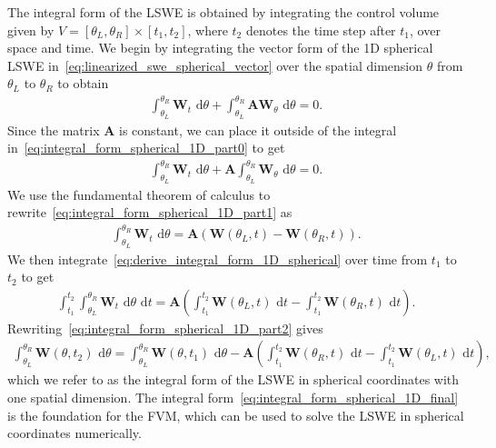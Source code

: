 The integral form of the LSWE is obtained by integrating the control volume given by $V = [\theta_L, \theta_R] \times [t_1, t_2]$, where $t_2$ denotes the time step after $t_1$, over space and time. 
We begin by integrating the vector form of the 1D spherical LSWE in~\eqref{eq:linearized_swe_spherical_vector} over the spatial dimension $\theta$ from $\theta_L$ to $\theta_R$ to obtain
\begin{align}\label{eq:integral_form_spherical_1D_part0}
    \int_{\theta_L}^{\theta_R} \mathbf{W}_t \text{ d}\theta + \int_{\theta_L}^{\theta_R} \mathbf{A} \mathbf{W}_\theta \text{ d}\theta = 0.
\end{align}
Since the matrix $\mathbf{A}$ is constant, we can place it outside of the integral in~\eqref{eq:integral_form_spherical_1D_part0} to get
\begin{align}\label{eq:integral_form_spherical_1D_part1}
    \int_{\theta_L}^{\theta_R} \mathbf{W}_t \text{ d}\theta + \mathbf{A} \int_{\theta_L}^{\theta_R} \mathbf{W}_\theta \text{ d}\theta = 0.
\end{align}
We use the fundamental theorem of calculus to rewrite~\eqref{eq:integral_form_spherical_1D_part1} as
\begin{align}\label{eq:derive_integral_form_1D_spherical}
    \int_{\theta_L}^{\theta_R} \mathbf{W}_t \text{ d}\theta =  \mathbf{A} \left( \mathbf{W}(\theta_L, t) - \mathbf{W}(\theta_R, t) \right).
\end{align}
We then integrate~\eqref{eq:derive_integral_form_1D_spherical} over time from $t_1$ to $t_2$ to get
\begin{align}\label{eq:integral_form_spherical_1D_part2}
    \int_{t_1}^{t_2} \int_{\theta_L}^{\theta_R} \mathbf{W}_t \text{ d}\theta \text{ d}t = \mathbf{A} \left( \int_{t_1}^{t_2} \mathbf{W}(\theta_L, t) \text{ d}t - \int_{t_1}^{t_2} \mathbf{W}(\theta_R, t) \text{ d}t \right).
\end{align}
Rewriting~\eqref{eq:integral_form_spherical_1D_part2} gives
\begin{align}\label{eq:integral_form_spherical_1D_final}
    \int_{\theta_L}^{\theta_R} \mathbf{W}(\theta, t_2) \text{ d}\theta = \int_{\theta_L}^{\theta_R} \mathbf{W}(\theta, t_1) \text{ d}\theta
    - \mathbf{A} \left( \int_{t_1}^{t_2} \mathbf{W}(\theta_R, t) \text{ d}t - \int_{t_1}^{t_2} \mathbf{W}(\theta_L, t) \text{ d}t \right),
\end{align}
which we refer to as the integral form of the LSWE in spherical coordinates with one spatial dimension.
The integral form~\eqref{eq:integral_form_spherical_1D_final} is the foundation for the FVM, which can be used to solve the LSWE in spherical coordinates numerically.



